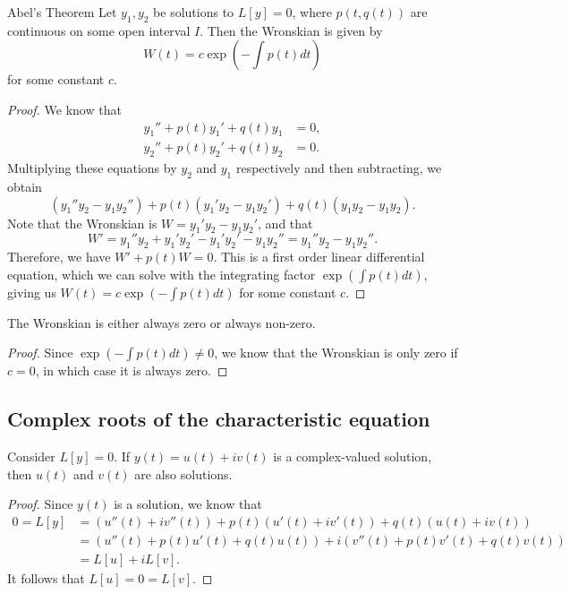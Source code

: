 \begin{thm}\label{abels-thm}Abel's Theorem\proofbreak
    Let $y_1, y_2$ be solutions to $L[y] = 0$, where $p(t, q(t))$ are continuous on some open interval $I$. Then the Wronskian is given by \[W(t) = c\exp\left(-\int p(t)dt\right)\] for some constant $c$.
\end{thm}

\begin{proof}
    We know that
    \begin{align*}
        y_1'' + p(t)y_1' + q(t)y_1 &= 0, \\
        y_2'' + p(t)y_2' + q(t)y_2 &= 0.
    \end{align*}
    Multiplying these equations by $y_2$ and $y_1$ respectively and then subtracting, we obtain
    \[(y_1''y_2 - y_1y_2'') + p(t)(y_1'y_2 - y_1y_2') + q(t)(y_1y_2 - y_1y_2).\] Note that the Wronskian is $W = y_1'y_2 - y_1y_2'$, and that
    \[W' = y_1''y_2 + y_1'y_2' - y_1'y_2' - y_1y_2'' = y_1''y_2 - y_1y_2''.\]
    Therefore, we have $W' + p(t)W = 0$. This is a first order linear differential equation, which we can solve with the integrating factor $\exp\left(\int p(t)dt\right)$, giving us $W(t) = c\exp\left(-\int p(t)dt\right)$ for some constant $c$.
\end{proof}

\begin{cor}\label{wronskian-always-zero}
    The Wronskian is either always zero or always non-zero.
\end{cor}

\begin{proof}
    Since $\exp\left(-\int p(t)dt\right) \neq 0$, we know that the Wronskian is only zero if $c = 0$, in which case it is always zero.
\end{proof}

\subsection{Complex roots of the characteristic equation}

\begin{thm}\label{complex-solution-decomposition}
    Consider $L[y] = 0$. If $y(t) = u(t) + iv(t)$ is a complex-valued solution, then $u(t)$ and $v(t)$ are also solutions.
\end{thm}

\begin{proof}
    Since $y(t)$ is a solution, we know that
    \begin{align*}
        0 = L[y] &= (u''(t) + iv''(t)) + p(t)(u'(t) + iv'(t)) + q(t)(u(t) + iv(t)) \\
        &= (u''(t) + p(t)u'(t) + q(t)u(t)) + i(v''(t) + p(t)v'(t) + q(t)v(t)) \\
        &= L[u] + iL[v].
    \end{align*}
    It follows that $L[u] = 0 = L[v]$.
\end{proof}

